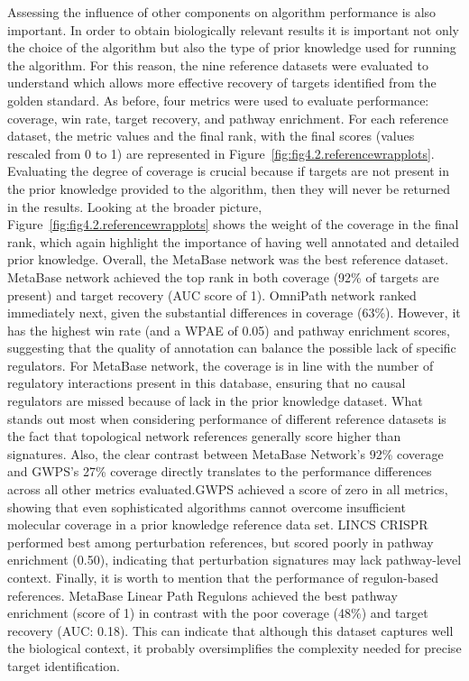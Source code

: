 Assessing the influence of other components on algorithm performance is also important. In order to obtain biologically relevant results it is important not only the choice of the algorithm but also the type of prior knowledge used for running the algorithm. For this reason, the nine reference datasets were evaluated to understand which allows more effective recovery of targets identified from the golden standard.
As before, four metrics were used to evaluate performance: coverage, win rate, target recovery, and pathway enrichment.
For each reference dataset, the metric values and the final rank, with the final scores (values rescaled from 0 to 1) are represented in Figure~\ref{fig:fig4.2.referencewrapplots}.
Evaluating the degree of coverage is crucial because if targets are not present in the prior knowledge provided to the algorithm, then they will never be returned in the results.
Looking at the broader picture, Figure~\ref{fig:fig4.2.referencewrapplots} shows the weight of the coverage in the final rank, which again highlight the importance of having well annotated and detailed prior knowledge.
Overall, the MetaBase network was the best reference dataset. MetaBase network achieved the top rank in both coverage (92\% of targets are present) and target recovery (\gls{AUC} score of 1).
OmniPath network ranked immediately next, given the substantial differences in coverage (63\%).
However, it has the highest win rate (and a \gls{WPAE} of 0.05) and pathway enrichment scores, suggesting that the quality of annotation can balance the possible lack of specific regulators.
For MetaBase network, the coverage is in line with the number of regulatory interactions present in this database, ensuring that no causal regulators are missed because of lack in the prior knowledge dataset.
What stands out most when considering performance of different reference datasets is the fact that topological network references generally score higher than signatures.
Also, the clear contrast between MetaBase Network's 92\% coverage and \gls{GWPS}'s 27\% coverage directly translates to the performance differences across all other metrics evaluated.\gls{GWPS} achieved a score of zero in all metrics, showing that even sophisticated algorithms cannot overcome insufficient molecular coverage in a prior knowledge reference data set. \gls{LINCS} \gls{CRISPR} performed best among perturbation references, but scored poorly in pathway enrichment (0.50), indicating that perturbation signatures may lack pathway-level context.
Finally, it is worth to mention that the performance of regulon-based references.
MetaBase Linear Path Regulons achieved the best pathway enrichment (score of 1) in contrast with the poor coverage (48\%) and target recovery (\gls{AUC}: 0.18).
This can indicate that although this dataset captures well the biological context, it probably oversimplifies the complexity needed for precise target identification.

